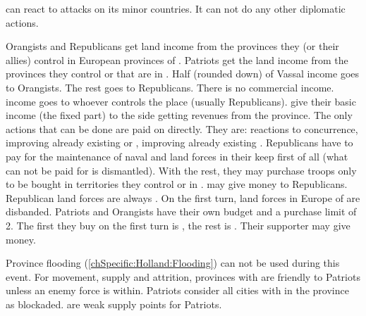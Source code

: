 \phdipl
\aparag \HOL can react to attacks on its minor countries. It can not do any
other diplomatic actions.

\phadm
\aparag[Incomes] Orangists and Republicans get land income from the provinces
they (or their allies) control in European provinces of \HOL.
\bparag Patriots get the land income from the provinces they control or that
are in \REVOLT.
\bparag Half (rounded down) of Vassal income goes to Orangists. The rest goes
to Republicans.
\bparag There is no commercial income. \ROTW income goes to whoever controls
the place (usually Republicans).
\bparag \MNU give their basic income (the fixed part) to the side getting
revenues from the province.
 The only actions that can be done are paid on
\HOL \RT directly. They are: reactions to concurrence, improving already
existing \COL or \TP, improving already existing \TradeFLEET.
 Republicans have to pay for the maintenance of naval
and land forces in their keep first of all (what can not be paid for is
dismantled). With the rest, they may purchase troops only to be bought in
territories they control or in \ANG. \ANG may give money to
Republicans. Republican land forces are always \Conscripts.
\bparag On the first turn, land forces in Europe of \HOL are disbanded.
\bparag Patriots and Orangists have their own budget and a purchase limit of
2\LD. The first \ARMY\facemoins they buy on the first turn is \Veteran, the
rest is \Conscripts. Their supporter may give money.

\phmil
\aparag Province flooding (\ref{chSpecific:Holland:Flooding}) can not be used
during this event.
\aparag For movement, supply and attrition, provinces with \REVOLT are
friendly to Patriots unless an enemy force is within.
\bparag Patriots consider all cities with \REVOLT in the province as
blockaded.
\bparag \REVOLT are weak supply points for Patriots.

